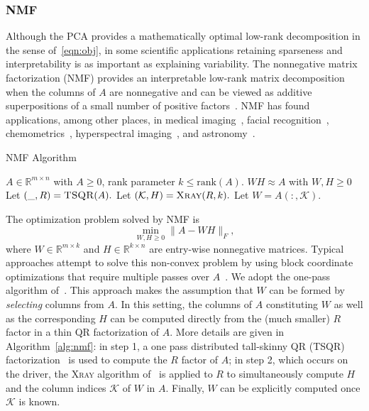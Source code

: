\subsubsection{NMF}
Although the PCA provides a mathematically optimal low-rank decomposition in the sense of~\eqref{eqn:obj}, in some scientific applications retaining sparseness and interpretability is as important as explaining variability. The nonnegative matrix factorization (NMF) provides an interpretable low-rank matrix decomposition when the columns of $A$ are nonnegative and can be viewed as additive superpositions of a small number of positive factors~\cite{gillis2014and}. NMF has found applications, among other places, in medical imaging~\cite{lee2001nmf}, facial recognition~\cite{guillamet2002non}, chemometrics~\cite{Paatero199723}, hyperspectral imaging~\cite{gillis2015hierarchical}, and astronomy~\cite{pauca2006nonnegative}.

\begin{algorithm}[tb]
    \caption{\textsc{NMF} Algorithm}
    \label{alg:nmf}
    \begin{algorithmic}[1]
      \Require $A \in \mathbb{R}^{m\times n}$ with $A \geq 0$, rank parameter $k \leq \textrm{rank}(A).$
      \Ensure $W H \approx A$ with $W,H \geq 0$
      \State Let $(\_, R) = \textsc{TSQR}(A).$
      \State Let $(\mathcal{K}, H) = \textsc{Xray}(R, k).$
      \State Let $W = A(:, \mathcal{K}).$
    \end{algorithmic}
  \end{algorithm}
  
The optimization problem solved by NMF is
\begin{equation}
\min_{W,H \geq 0} \|A - WH\|_F,
\end{equation}
where $W \in \mathbb{R}^{m \times k}$ and $H \in \mathbb{R}^{k \times n}$ are entry-wise nonnegative matrices. Typical approaches attempt to solve this non-convex problem by using block coordinate optimizations that require multiple passes over $A$~\cite{kim2014algorithms}. We adopt the one-pass algorithm of~\cite{benson2014scalable}. This approach makes the assumption that $W$ can be formed by {\it selecting} columns from $A$. In this setting, the columns of $A$ constituting $W$ as well as the corresponding $H$ can be computed directly from the (much smaller) $R$ factor in a thin QR factorization of $A$. More details are given in Algorithm~\ref{alg:nmf}: in step 1, a one pass distributed tall-skinny QR (\textsc{TSQR}) factorization~\cite{demmel2012communication} is used to compute the $R$ factor of $A$; in step 2, which occurs on the driver, the \textsc{Xray} algorithm of~\cite{kumar2013fast} is applied to $R$ to simultaneously compute $H$ and the column indices $\mathcal{K}$ of $W$ in $A$. Finally, $W$ can be explicitly computed once $\mathcal{K}$ is known.

